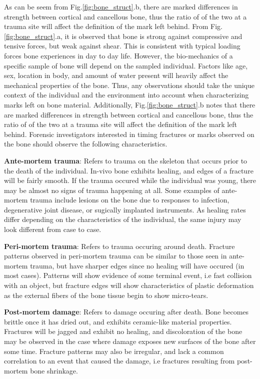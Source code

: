 \documentclass[titlepage]{article}
\begin{document}
As can be seem from Fig.\ref{fig:bone_struct}.b, there are marked differences in strength between cortical and cancellous bone, thus the ratio of of the two at a trauma site will affect the definition of the mark left behind.  From Fig.\ref{fig:bone_struct}.a, it is observed that bone is strong against compressive and tensive forces, but weak against shear. This is consistent with typical loading forces bone experiences in day to day life. However, the bio-mechanics of a specific sample of bone will depend on the sampled individual. Factors like age, sex, location in body, and amount of water present will heavily affect the mechanical properties of the bone. Thus, any observations should take the unique context of the individual and the environment into account when characterizing marks left on bone material. Additionally, Fig.\ref{fig:bone_struct}.b notes that there are marked differences in strength between cortical and cancellous bone, thus the ratio of of the two at a trauma site will affect the definition of the mark left behind. Forensic investigators interested in timing fractures or marks observed on the bone should observe the following characteristics.

\textbf{Ante-mortem trauma}: Refers to trauma on the skeleton that occurs prior to the death of the individual. In-vivo bone exhibits healing, and edges of a fracture will be fairly smooth. If the trauma occured while the individual was young, there may be almost no signs of trauma happening at all. Some examples of ante-mortem trauma include lesions on the bone due to responses to infection, degenerative joint disease, or sugically implanted instruments. As healing rates differ depending on the characteristics of the individual, the same injury may look different from case to case.

\textbf{Peri-mortem trauma}: Refers to trauma occuring around death. Fracture patterns observed in peri-mortem trauma can be similar to those seen in ante-mortem trauma, but have sharper edges since no healing will have occured (in most cases). Patterns will show evidence of some terminal event, i.e fast collision with an object, but fracture edges will show characteristics of plastic deformation as the external fibers of the bone tissue begin to show micro-tears.

\textbf{Post-mortem damage}: Refers to damage occuring after death. Bone becomes brittle once it has dried out, and exhibits ceramic-like material properties. Fractures will be jagged and exhibit no healing, and discoloration of the bone may be observed in the case where damage exposes new surfaces of the bone after some time. Fracture patterns may also be irregular, and lack a common correlation to an event that caused the damage, i.e fractures resulting from post-mortem bone shrinkage.\cite{trauma, evid}
\end{document}
